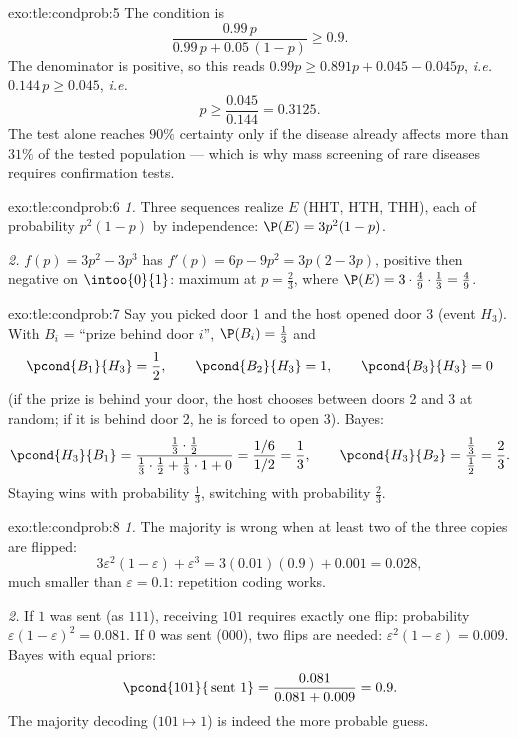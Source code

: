 \begin{solution}{exo:tle:condprob:5}
The condition is
\[
\frac{0.99\,p}{0.99\,p + 0.05\,(1-p)} \geq 0.9 .
\]
The denominator is positive, so this reads
$0.99p \geq 0.891p + 0.045 - 0.045p$, \emph{i.e.} $0.144\,p \geq 0.045$,
\emph{i.e.}
\[
p \geq \frac{0.045}{0.144} = 0.3125 .
\]
The test alone reaches $90\%$ certainty only if the disease already affects
more than $31\%$ of the tested population --- which is why mass screening
of rare diseases requires confirmation tests.
\end{solution}

\begin{solution}{exo:tle:condprob:6}
\emph{1.} Three sequences realize $E$ (HHT, HTH, THH), each of probability
$p^2(1-p)$ by independence: $\P(E) = 3p^2(1 - p)$.

\emph{2.} $f(p) = 3p^2 - 3p^3$ has $f'(p) = 6p - 9p^2 = 3p(2 - 3p)$,
positive then negative on $\intoo{0}{1}$: maximum at $p = \frac23$, where
$\P(E) = 3\cdot\frac49\cdot\frac13 = \frac49$.
\end{solution}

\begin{solution}{exo:tle:condprob:7}
Say you picked door 1 and the host opened door 3 (event $H_3$). With
$B_i$ = ``prize behind door $i$'', $\P(B_i) = \frac13$ and
\[
\pcond{B_1}{H_3} = \frac12, \qquad
\pcond{B_2}{H_3} = 1, \qquad
\pcond{B_3}{H_3} = 0
\]
(if the prize is behind your door, the host chooses between doors 2 and 3
at random; if it is behind door 2, he is forced to open 3). Bayes:
\[
\pcond{H_3}{B_1}
= \frac{\frac13\cdot\frac12}{\frac13\cdot\frac12 + \frac13\cdot1 + 0}
= \frac{1/6}{1/2} = \frac13,
\qquad
\pcond{H_3}{B_2} = \frac{\frac13}{\frac12} = \frac23 .
\]
Staying wins with probability $\frac13$, switching with probability
$\frac23$.
\end{solution}

\begin{solution}{exo:tle:condprob:8}
\emph{1.} The majority is wrong when at least two of the three copies are
flipped:
\[
3\varepsilon^2(1-\varepsilon) + \varepsilon^3
= 3(0.01)(0.9) + 0.001 = 0.028,
\]
much smaller than $\varepsilon = 0.1$: repetition coding works.

\emph{2.} If $1$ was sent (as $111$), receiving $101$ requires exactly one
flip: probability $\varepsilon(1-\varepsilon)^2 = 0.081$. If $0$ was sent
($000$), two flips are needed: $\varepsilon^2(1-\varepsilon) = 0.009$.
Bayes with equal priors:
\[
\pcond{101}{\,\text{sent }1} = \frac{0.081}{0.081 + 0.009} = 0.9 .
\]
The majority decoding ($101 \mapsto 1$) is indeed the more probable guess.
\end{solution}

